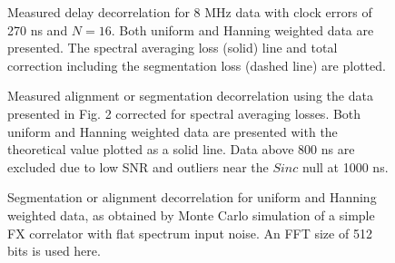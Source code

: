 \clearpage
\begin{figure}[p]
\vspace{22cm}
\caption[]{Measured delay decorrelation for 8 MHz data with clock
errors of 270 ns and $N=16$. Both uniform
and Hanning weighted data are presented. The spectral averaging loss
(solid) line and total correction including the segmentation loss
(dashed line) are plotted.}
\label{prfig3}
\end{figure}

\clearpage
\begin{figure}[p]
\vspace{22cm}
\caption[]{Measured alignment or segmentation decorrelation using the
data presented in Fig. 2 corrected for spectral averaging losses. Both
uniform and Hanning weighted data are presented with the theoretical
value plotted as a solid line. Data above 800 ns are excluded due to
low SNR and outliers near the $Sinc$ null at 1000 ns.}
\label{prfig4}
\end{figure}

\clearpage
\begin{figure}[p]
\vspace{22cm}
\caption[]{Segmentation or alignment decorrelation for uniform and
Hanning weighted data, as obtained by Monte Carlo simulation of a
simple FX correlator with flat spectrum input noise. An FFT size of
512 bits is used here.}
\label{prfig5}
\end{figure}



